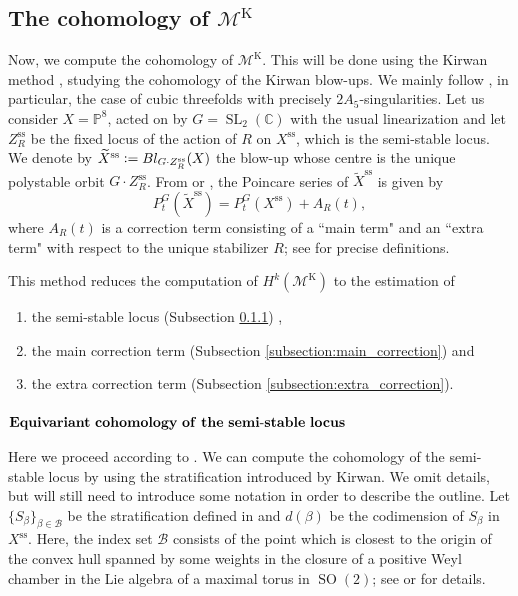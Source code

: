 \documentclass[12pt, pdftex]{amsart}
\theoremstyle{plain}
\theoremstyle{definition}
\numberwithin{equation}{section}
\def\C{{\mathbb C}}
\def\P{{\mathbb P}}
\def\SL{\mathop{\mathrm{SL}}\nolimits}
\def\ss{\mathop{\mathrm{ss}}}
\def\K{\mathrm{K}}
\def\M{\mathcal{M}}
\def\SO{\mathop{\mathrm{SO}}\nolimits}
\newcommand{\defeq}{\vcentcolon=}
\begin{document}
\subsection{The cohomology of $\M^{\K}$}
Now, we compute the cohomology of $\M^{\K}$.
This will be done using the Kirwan method \cite{Ki84, Ki85, Ki89}, studying the cohomology of the Kirwan blow-ups.
We mainly follow \cite[Chapter 3, 4]{CMGHL19}, in particular, the case of cubic threefolds with precisely $2A_5$-singularities.
Let us consider $X=\P^8$, acted on by $G=\SL_2(\C)$ with the usual linearization and let $Z_R^{\ss}$ be the fixed locus of the action of $R$ on $X^{\ss}$, which is the semi-stable locus.
We denote by $\widetilde{X}^{\ss}\defeq Bl_{G\cdot Z_R^{\ss}}(X)$ the blow-up whose centre
is the unique polystable orbit $G\cdot Z_R^{\ss}$. 
From \cite[Section 3 Eq. 3.2]{Ki89} or \cite[Subsection 4.12, (4.22)]{CMGHL19}, 
the Poincare series of $\widetilde{X}^{\ss}$ is given by 
\[P_t^G(\widetilde{X}^{\ss})=P_t^G(X^{\ss})+A_R(t),\]
where $A_R(t)$ is a correction term consisting  of a ``main term" and an  ``extra term" with respect to the unique stabilizer $R$; see \cite[Section 4.1.2]{CMGHL19} for precise definitions.

This method reduces the computation of $H^k(\M^{\K})$ to the estimation of  
\begin{enumerate}
    \item the semi-stable locus (Subsection \ref{subsection:semi-stable}) ,
    \item the main correction term (Subsection \ref{subsection:main_correction}) and  
    \item the extra correction term (Subsection \ref{subsection:extra_correction}).
\end{enumerate}


\subsubsection{$\mathrm{\mathbf{Equivariant \ cohomology\ of\ the\ semi\mathchar`-stable\ locus}}$}
\label{subsection:semi-stable}

Here we proceed according to \cite[Chapter 3]{CMGHL19}.
We can compute the cohomology of the semi-stable locus by using the stratification introduced by Kirwan.
We omit details, but will still need to introduce some notation in order to describe the outline. 
Let $\{S_{\beta}\}_{\beta\in\mathcal{B}}$ be the stratification defined in \cite[Theorem 4.16]{Ki84} and $d(\beta)$ be the codimension of $S_{\beta}$ in $X^{\ss}$.
Here, the index set $\mathcal{B}$ consists of the point which is closest to the origin of the convex hull spanned by some weights in the closure of a positive Weyl chamber in the Lie algebra of a maximal torus in $\SO(2)$; see \cite[Chapter 3]{CMGHL19} or \cite[Definition 3.13]{Ki84} for details.
\end{document}
